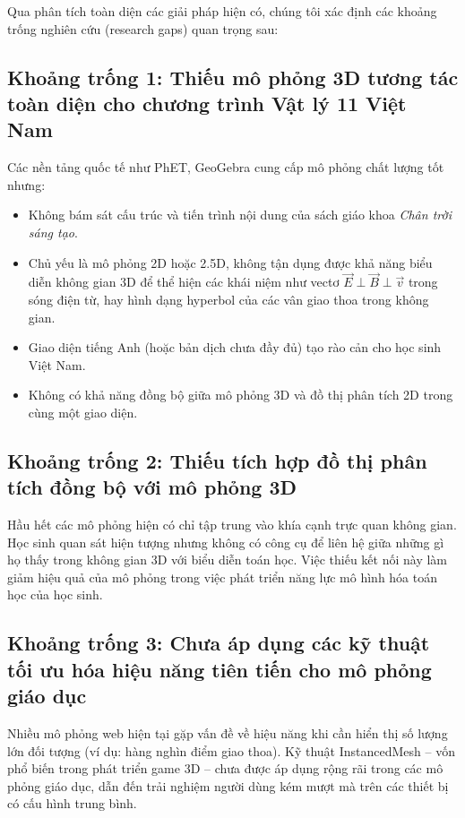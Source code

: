 Qua phân tích toàn diện các giải pháp hiện có, chúng tôi xác định các khoảng trống nghiên cứu (research gaps) quan trọng sau:

\subsection{Khoảng trống 1: Thiếu mô phỏng 3D tương tác toàn diện cho chương trình Vật lý 11 Việt Nam}

Các nền tảng quốc tế như PhET, GeoGebra cung cấp mô phỏng chất lượng tốt nhưng:
\begin{itemize}
    \item Không bám sát cấu trúc và tiến trình nội dung của sách giáo khoa \textit{Chân trời sáng tạo}.
    \item Chủ yếu là mô phỏng 2D hoặc 2.5D, không tận dụng được khả năng biểu diễn không gian 3D để thể hiện các khái niệm như vectơ $\vec{E} \perp \vec{B} \perp \vec{v}$ trong sóng điện từ, hay hình dạng hyperbol của các vân giao thoa trong không gian.
    \item Giao diện tiếng Anh (hoặc bản dịch chưa đầy đủ) tạo rào cản cho học sinh Việt Nam.
    \item Không có khả năng đồng bộ giữa mô phỏng 3D và đồ thị phân tích 2D trong cùng một giao diện.
\end{itemize}

\subsection{Khoảng trống 2: Thiếu tích hợp đồ thị phân tích đồng bộ với mô phỏng 3D}

Hầu hết các mô phỏng hiện có chỉ tập trung vào khía cạnh trực quan không gian. Học sinh quan sát hiện tượng nhưng không có công cụ để liên hệ giữa những gì họ thấy trong không gian 3D với biểu diễn toán học. Việc thiếu kết nối này làm giảm hiệu quả của mô phỏng trong việc phát triển năng lực mô hình hóa toán học của học sinh.

\subsection{Khoảng trống 3: Chưa áp dụng các kỹ thuật tối ưu hóa hiệu năng tiên tiến cho mô phỏng giáo dục}

Nhiều mô phỏng web hiện tại gặp vấn đề về hiệu năng khi cần hiển thị số lượng lớn đối tượng (ví dụ: hàng nghìn điểm giao thoa). Kỹ thuật InstancedMesh – vốn phổ biến trong phát triển game 3D – chưa được áp dụng rộng rãi trong các mô phỏng giáo dục, dẫn đến trải nghiệm người dùng kém mượt mà trên các thiết bị có cấu hình trung bình.

